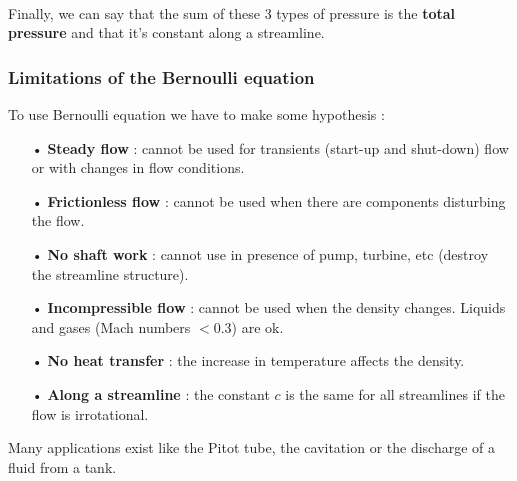 		\ \\ Finally, we can say that the sum of these 3 types of pressure is the \textbf{total pressure} and that it's constant along a streamline. 

		\subsubsection{Limitations of the Bernoulli equation}
			To use Bernoulli equation we have to make some hypothesis : 
			\begin{itemize}
				\item[•] \textbf{Steady flow} : cannot be used for transients (start-up and shut-down) flow or with changes in flow conditions. 
				\item[•] \textbf{Frictionless flow} : cannot be used when there are components disturbing the flow.
				\item[•] \textbf{No shaft work} : cannot use in presence of pump, turbine, etc (destroy the streamline structure).
				\item[•] \textbf{Incompressible flow} : cannot be used when the density changes. Liquids and gases (Mach numbers $<0.3$) are ok.
				\item[•] \textbf{No heat transfer} : the increase in temperature affects the density.
				\item[•] \textbf{Along a streamline} : the constant $c$ is the same for all streamlines if the flow is irrotational.
			\end{itemize}				
			Many applications exist like the Pitot tube, the cavitation or the discharge of a fluid from a tank. 
			
